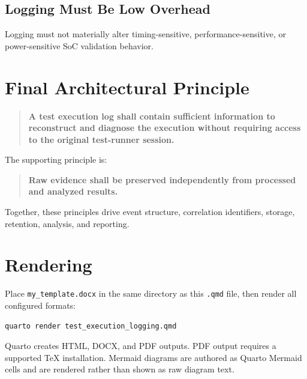 \documentclass[
  11pt,
  letterpaper,
  DIV=11,
  numbers=noendperiod]{scrartcl}
\begin{document}
\subsection{Logging Must Be Low
Overhead}\label{logging-must-be-low-overhead}

Logging must not materially alter timing-sensitive,
performance-sensitive, or power-sensitive SoC validation behavior.

\section{Final Architectural
Principle}\label{final-architectural-principle}

\begin{quote}
\textbf{A test execution log shall contain sufficient information to
reconstruct and diagnose the execution without requiring access to the
original test-runner session.}
\end{quote}

The supporting principle is:

\begin{quote}
\textbf{Raw evidence shall be preserved independently from processed and
analyzed results.}
\end{quote}

Together, these principles drive event structure, correlation
identifiers, storage, retention, analysis, and reporting.

\section{Rendering}\label{rendering}

Place \texttt{my\_template.docx} in the same directory as this
\texttt{.qmd} file, then render all configured formats:

\begin{verbatim}
quarto render test_execution_logging.qmd
\end{verbatim}

Quarto creates HTML, DOCX, and PDF outputs. PDF output requires a
supported TeX installation. Mermaid diagrams are authored as Quarto
Mermaid cells and are rendered rather than shown as raw diagram text.
\end{document}
